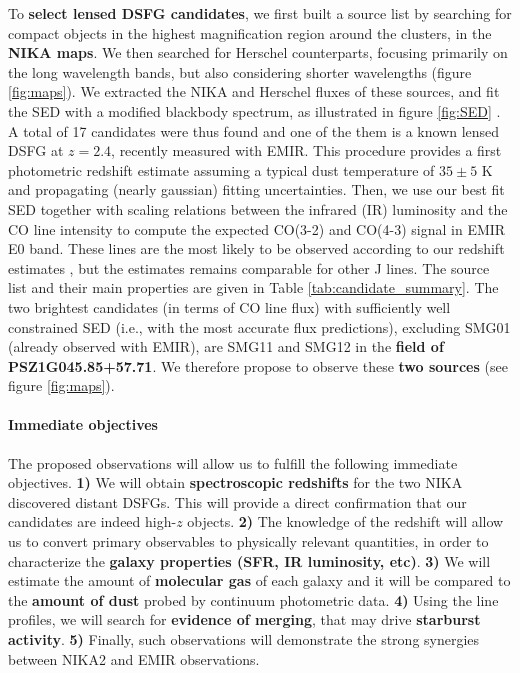 \documentclass[11pt,a4paper,twoside,graphicx,color]{article}
\begin{document}
To {\bf select lensed DSFG candidates}, we first built a source list by searching for compact objects in the highest magnification region around the clusters, in the {\bf NIKA maps}. We then searched for Herschel counterparts, focusing primarily on the long wavelength bands, but also considering shorter wavelengths (figure \ref{fig:maps}). We extracted the NIKA and Herschel fluxes of these sources, and fit the SED with a modified blackbody spectrum, as illustrated in figure \ref{fig:SED} \cite[see][for details]{Adam2016a}. A total of 17 candidates were thus found and one of the them is a known lensed DSFG at $z=2.4$, recently measured with EMIR. This procedure provides a first photometric redshift estimate assuming a typical dust temperature of $35 \pm 5$ K and propagating (nearly gaussian) fitting uncertainties. Then, we use our best fit SED together with scaling relations between the infrared (IR) luminosity  and the CO line intensity \citep{Greve2014} to compute the expected CO(3-2) and CO(4-3) signal in EMIR E0 band. These lines are the most likely to be observed according to our redshift estimates \citep{Carilli2013}, but the estimates remains comparable for other J lines. The source list and their main properties are given in Table \ref{tab:candidate_summary}. The two brightest candidates (in terms of CO line flux) with sufficiently well constrained SED (i.e., with the most accurate flux predictions), excluding SMG01 (already observed with EMIR), are SMG11 and SMG12 in the {\bf field of \mbox{PSZ1G045.85+57.71}}. We therefore propose to observe these {\bf two sources} (see figure \ref{fig:maps}).

\paragraph{\large Immediate objectives}
The proposed observations will allow us to fulfill the following immediate objectives. {\bf 1)} We will obtain {\bf spectroscopic redshifts} for the two NIKA discovered distant DSFGs. This will provide a direct confirmation that our candidates are indeed high-$z$ objects. {\bf 2)} The knowledge of the redshift will allow us to convert primary observables to physically relevant quantities, in order to characterize the {\bf galaxy properties (SFR, IR luminosity, etc)}. {\bf 3)} We will estimate the amount of {\bf molecular gas} of each galaxy and it will be compared to the {\bf amount of dust} probed by continuum photometric data. {\bf 4)} Using the line profiles, we will search for {\bf evidence of merging}, that may drive {\bf starburst activity}. {\bf 5)} Finally, such observations will demonstrate the strong synergies between NIKA2 and EMIR observations.
\end{document}
